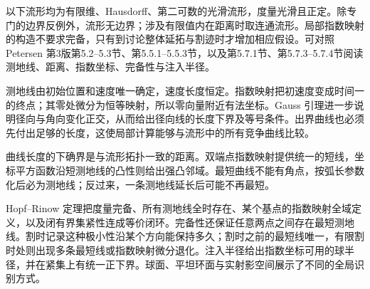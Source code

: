 \ProseParagraphBreak

以下流形均为有限维、Hausdorff、第二可数的光滑流形，度量光滑且正定。除专门的边界反例外，流形无边界；涉及有限值内在距离时取连通流形。局部指数映射的构造不要求完备，只有到讨论整体延拓与割迹时才增加相应假设。可对照 Petersen 第3版第5.2--5.3节、第5.5.1--5.5.3节，以及第5.7.1节、第5.7.3--5.7.4节阅读测地线、距离、指数坐标、完备性与注入半径\cite[第5.2--5.3节; 第5.5.1--5.5.3节; 第5.7.1节; 第5.7.3--5.7.4节]{Petersen2016}。






\begin{chaptersummary}
	测地线由初始位置和速度唯一确定，速度长度恒定。指数映射把初速度变成时间一的终点；其零处微分为恒等映射，所以零向量附近有法坐标。Gauss 引理进一步说明径向与角向变化正交，从而给出径向线的长度下界及等号条件。出界曲线也必须先付出足够的长度，这使局部计算能够与流形中的所有竞争曲线比较。

	\ProseParagraphBreak

	曲线长度的下确界是与流形拓扑一致的距离。双端点指数映射提供统一的短线，坐标平方函数沿短测地线的凸性则给出强凸邻域。最短曲线不能有角点，按弧长参数化后必为测地线；反过来，一条测地线延长后可能不再最短。

	\ProseParagraphBreak

	Hopf--Rinow 定理把度量完备、所有测地线全时存在、某个基点的指数映射全域定义，以及闭有界集紧性连成等价闭环。完备性还保证任意两点之间存在最短测地线。割时记录这种极小性沿某个方向能保持多久；割时之前的最短线唯一，有限割时处则出现多条最短线或指数映射微分退化。注入半径给出指数坐标可用的球半径，并在紧集上有统一正下界。球面、平坦环面与实射影空间展示了不同的全局识别方式。
\end{chaptersummary}

\BookExercises

